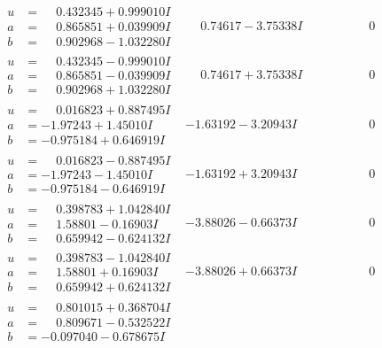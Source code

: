 \documentclass[1p]{elsarticle_modified}
\theoremstyle{definition}
\begin{document}
$$\begin{array}{c|c|c}
\begin{aligned}
u &= \phantom{-}0.432345 + 0.999010 I \\
a &= \phantom{-}0.865851 + 0.039909 I \\
b &= \phantom{-}0.902968 - 1.032280 I\end{aligned}
 & \phantom{-}0.74617 - 3.75338 I & \phantom{-0.000000 } 0 \\ \hline\begin{aligned}
u &= \phantom{-}0.432345 - 0.999010 I \\
a &= \phantom{-}0.865851 - 0.039909 I \\
b &= \phantom{-}0.902968 + 1.032280 I\end{aligned}
 & \phantom{-}0.74617 + 3.75338 I & \phantom{-0.000000 } 0 \\ \hline\begin{aligned}
u &= \phantom{-}0.016823 + 0.887495 I \\
a &= -1.97243 + 1.45010 I \\
b &= -0.975184 + 0.646919 I\end{aligned}
 & -1.63192 - 3.20943 I & \phantom{-0.000000 } 0 \\ \hline\begin{aligned}
u &= \phantom{-}0.016823 - 0.887495 I \\
a &= -1.97243 - 1.45010 I \\
b &= -0.975184 - 0.646919 I\end{aligned}
 & -1.63192 + 3.20943 I & \phantom{-0.000000 } 0 \\ \hline\begin{aligned}
u &= \phantom{-}0.398783 + 1.042840 I \\
a &= \phantom{-}1.58801 - 0.16903 I \\
b &= \phantom{-}0.659942 - 0.624132 I\end{aligned}
 & -3.88026 - 0.66373 I & \phantom{-0.000000 } 0 \\ \hline\begin{aligned}
u &= \phantom{-}0.398783 - 1.042840 I \\
a &= \phantom{-}1.58801 + 0.16903 I \\
b &= \phantom{-}0.659942 + 0.624132 I\end{aligned}
 & -3.88026 + 0.66373 I & \phantom{-0.000000 } 0 \\ \hline\begin{aligned}
u &= \phantom{-}0.801015 + 0.368704 I \\
a &= \phantom{-}0.809671 - 0.532522 I \\
b &= -0.097040 - 0.678675 I\end{aligned}

\end{array}$$
\end{document}
